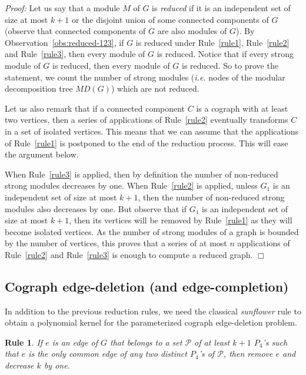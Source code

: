 \documentclass[11pt]{article}
\newenvironment{proof}{\noindent\textit{Proof: }}{{\hfill $\Box$}}
\newtheorem{reduction}{Rule}
\begin{document}
\begin{proof}
Let us say that a module $M$ of $G$ is \emph{reduced} if it is an independent set of size at most $k+1$ or the disjoint union of some connected components of $G$ (observe that connected components of $G$ are also modules of $G$). By Observation~\ref{obs:reduced-123}, if $G$ is reduced under Rule~\ref{rule1}, Rule~\ref{rule2} and Rule~\ref{rule3}, then every module of $G$ is reduced. Notice that if every strong module of $G$ is reduced, then every module of $G$ is reduced.
So to prove the statement, we count the number of strong modules (\textit{i.e.} nodes of the modular decomposition tree $MD(G)$) which are not reduced. 

Let us also remark that if a connected component $C$ is a cograph with at least two vertices, then a series of applications of Rule~\ref{rule2} eventually transforms $C$ in a set of isolated vertices. This means that we can assume that the applications of Rule~\ref{rule1} is postponed to the end of the reduction process. This will ease the argument below.

When Rule~\ref{rule3} is applied, then by definition the number of non-reduced strong modules decreases by one. When Rule~\ref{rule2} is applied, unless $G_1$ is an independent set of size at most $k+1$, then the number of non-reduced strong modules also decreases by one. But observe that if $G_1$ is an independent set of size at most $k+1$, then its vertices will be removed by Rule~\ref{rule1} as they will become isolated vertices. As the number of strong modules of a graph is bounded by the number of vertices, this proves that a series of at most $n$ applications of Rule~\ref{rule2} and Rule~\ref{rule3} is enough to compute a reduced graph.
\end{proof}

\subsection{Cograph edge-deletion (and edge-completion)}

In addition to the previous reduction rules, we need the classical \emph{sunflower} rule to obtain a polynomial kernel for the parameterized cograph edge-deletion problem.

\begin{reduction} \label{rule:sunflower-del}
If $e$ is an edge of $G$ that belongs to a set $\mathcal{P}$ of at least $k+1$ $P_4$'s such that $e$ is the only common edge of any two distinct $P_4$'s of $\mathcal{P}$, then remove $e$ and decrease $k$ by one.
\end{reduction}
\end{document}
